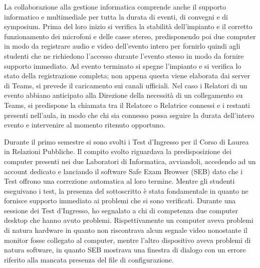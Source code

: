             \par
                La collaborazione alla gestione informatica comprende anche il supporto informatico e multimediale per tutta la durata di eventi, di convegni e di symposium. Prima del loro inizio si verifica la stabilità dell'impianto e il corretto funzionamento dei microfoni e delle casse stereo, predisponendo poi due computer in modo da registrare audio e video dell'evento intero per fornirlo quindi agli studenti che ne richiedono l'accesso durante l'evento stesso in modo da fornire supporto immediato. Ad evento terminato si spegne l'impianto e si verifica lo stato della registrazione completa; non appena questa viene elaborata dai server di Teams, si prevede il caricamento sui canali ufficiali. \newline
                Nel caso i Relatori di un evento abbiano anticipato alla Direzione della necessità di un collegamento su Teams, si predispone la chiamata tra il Relatore o Relatrice connessi e i restanti presenti nell'aula, in modo che chi sia connesso possa seguire la durata dell'intero evento e intervenire al momento ritenuto opportuno. 
            \par
                Durante il primo semestre si sono svolti i Test d'Ingresso per il Corso di Laurea in Relazioni Pubbliche. Il compito svolto riguardava la predisposizione dei computer presenti nei due Laboratori di Informatica, avviandoli, accedendo ad un account dedicato e lanciando il software Safe Exam Browser (SEB) dato che i Test offrono una correzione automatica al loro termine. Mentre gli studenti eseguivano i test, la presenza del sottoscritto è stata fondamentale in quanto ne fornisce supporto immediato ai problemi che si sono verificati. \newline
                Durante una sessione dei Test d'Ingresso, ho segnalato a chi di competenza due computer desktop che hanno avuto problemi. Rispettivamente un computer aveva problemi di natura hardware in quanto non riscontrava alcun segnale video nonostante il monitor fosse collegato al computer, mentre l'altro dispositivo aveva problemi di natura software, in quanto SEB mostrava una finestra di dialogo con un errore riferito alla mancata presenza del file di configurazione.
